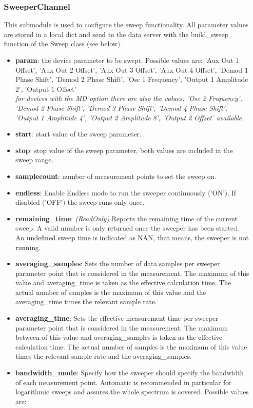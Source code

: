 \documentclass[11pt]{article} %
\begin{document}
\subsubsection{SweeperChannel}
This submodule is used to configure the sweep functionality. All parameter values are stored in a local dict and send  to the data server with the build\_sweep function of the Sweep class (see below).
\begin{itemize}
\item {\bf param}: the device parameter to be swept. Possible values are: 'Aux Out 1 Offset', 'Aux Out 2 Offset',
	'Aux Out 3 Offset', 'Aux Out 4 Offset', 'Demod 1 Phase Shift', 'Demod 2 Phase Shift', 'Osc 1 Frequency',
	'Output 1 Amplitude 2', 'Output 1 Offset' \\
	{\it for devices with the MD option there are also the values: 'Osc 2 Frequency', 'Demod 2 Phase Shift',
	'Demod 3 Phase Shift', 'Demod 4 Phase Shift', 'Output 1 Amplitude 4', 'Output 2 Amplitude 8', 'Output 2 Offset'
	available.}
\item {\bf start}: start value of the sweep parameter.
\item {\bf stop}: stop value of the sweep parameter, both values are included in the sweep range.
\item {\bf samplecount}: number of measurement points to set the sweep on.
\item {\bf endless}: Enable Endless mode to run the sweeper continuously ('ON'). If disabled ('OFF') the sweep runs only once.
\item {\bf remaining\_time}: {\it (ReadOnly)} Reports the remaining time of the current sweep. A valid number is only returned once the sweeper has been started. An undefined sweep time is indicated as NAN, that means, the sweeper is not running.
\item {\bf averaging\_samples}: Sets the number of data samples per sweeper parameter point that is considered in the measurement. The maximum of this value and averaging\_time is taken as the effective calculation time. The actual number of samples is the maximum of this value and the averaging\_time times the relevant sample rate.
\item {\bf averaging\_time}: Sets the effective measurement time per sweeper parameter point that is considered in the measurement. The maximum between of this value and averaging\_samples is taken as the effective calculation time. The actual number of samples is the maximum of this value times the relevant sample rate and the averaging\_samples.
\item {\bf bandwidth\_mode}: Specify how the sweeper should specify the bandwidth of each measurement point. Automatic is recommended in particular for logarithmic sweeps and assures the whole spectrum is covered. Possible values are:


\end{itemize}
\end{document}
